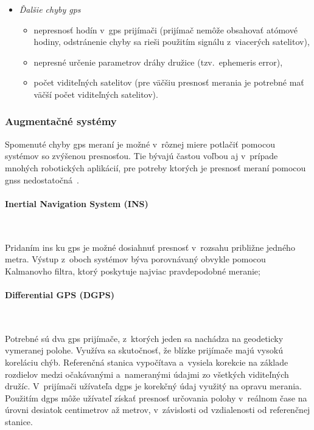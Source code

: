 \begin{itemize}
        \item \emph{Ďalšie chyby \acrshort{gps}}
        \begin{itemize}
          \item nepresnosť hodín v~\acrshort{gps} prijímači (prijímač nemôže obsahovať atómové hodiny, odstránenie chyby sa rieši použitím signálu z~viacerých satelitov),
          \item nepresné určenie parametrov dráhy družice (tzv.\ ephemeris error),
          \item počet viditeľných satelitov (pre väčšiu presnosť merania je potrebné mať väčší počet viditeľných satelitov).
        \end{itemize}
      \end{itemize}

    \subsubsection{Augmentačné systémy}
      Spomenuté chyby \acrshort{gps} meraní je možné v~rôznej miere potlačiť pomocou systémov so zvýšenou presnosťou. Tie bývajú častou voľbou aj v~prípade mnohých robotických aplikácií, pre potreby ktorých je presnosť meraní pomocou \acrshort{gnss} nedostatočná~\cite{duchonSnimaceMobilnejRobotike2012}.
    
      \paragraph{Inertial Navigation System (INS)} \
      
      \noindent Pridaním \acrshort{ins} ku \acrshort{gps} je možné dosiahnuť presnosť v~rozsahu približne jedného metra. Výstup z~oboch systémov býva porovnávaný obvykle pomocou Kalmanovho filtra, ktorý poskytuje najviac pravdepodobné meranie;
    
      \paragraph{Differential GPS (DGPS)} \
      
      \noindent Potrebné sú dva \acrshort{gps} prijímače, z~ktorých jeden sa nachádza na geodeticky vymeranej polohe. Využíva sa skutočnosť, že blízke prijímače majú vysokú koreláciu chýb. Referenčná stanica vypočítava a~vysiela korekcie na základe rozdielov medzi očakávanými a~nameranými údajmi zo všetkých viditeľných družíc. V~prijímači užívateľa \acrshort{dgps} je korekčný údaj využitý na opravu merania. Použitím \acrshort{dgps} môže užívateľ získať presnosť určovania polohy v~reálnom čase na úrovni desiatok centimetrov až metrov, v~závislosti od vzdialenosti od referenčnej stanice.

